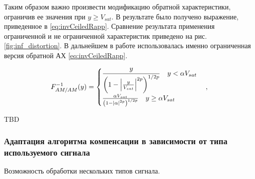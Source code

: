 Таким образом важно произвести модификацию обратной характеристики,
ограничив ее значения при $y \geq V_{sat}$. В результате было получено
выражение, приведенное в \ref{eq:invCeiledRapp}. Сравнение результата
применения ограниченной и не ограниченной характеристик приведено на рис.
\ref{fig:inf_distortion}. В дальнейшем в работе использовалась именно
ограниченная версия обратной АХ \ref{eq:invCeiledRapp}.

\begin{equation}
    F^{-1}_{AM/AM}(y) = 
    \begin{cases}
        \displaystyle
       \frac{ y}{\left( 1 - \abs{\frac{y}{V_{sat}}}^{2p}\right)^{1/2p}}
       \quad y <\alpha V_{sat}\\
       \frac{ \alpha V_{sat}}{\left( 1 - \abs{\alpha}^{2p}\right)^{1/2p}}
       \quad y \geq \alpha V_{sat}
    \end{cases},
    \label{eq:invCeiledRapp}
\end{equation}




TBD





\subsubsection{Адаптация алгоритма компенсации в зависимости от типа используемого сигнала}
\label{sec:apadt}
Возможность обработки нескольких типов сигнала.